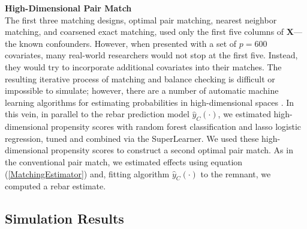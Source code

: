\documentclass[12pt]{article}\usepackage[]{graphicx}\usepackage[]{color}
\newcommand{\algorithm}{\hat{y}_C(\cdot)}
\newcommand{\covMat}{\bm{X}}
\begin{document}
\textbf{High-Dimensional Pair Match}\\
The first three matching designs, optimal pair matching, nearest
neighbor matching, and coarsened exact matching, used only the first
five columns of $\covMat$---the known confounders.
However, when presented with a set of $p=600$ covariates, many
real-world researchers would not stop at the first five.
Instead, they would try to incorporate additional covariates into their matches.
The resulting iterative process of matching and balance checking is
difficult or impossible to simulate; however, there are
a number of automatic machine learning algorithms for estimating
probabilities in high-dimensional spaces \citep[e.g.][]{twang,highDimPS}.
In this vein, in parallel to the rebar prediction model $\algorithm$,
we estimated high-dimensional propensity scores with random forest
classification and lasso logistic regression, tuned and combined via the
SuperLearner.
We used these high-dimensional propensity scores to construct a second
optimal pair match.
As in the conventional pair match, we estimated effects using equation
(\ref{MatchingEstimator}) and, fitting algorithm $\algorithm$ to the
remnant, we computed a rebar estimate.


\subsection{Simulation Results}\label{sec:sim-results}


\end{document}
